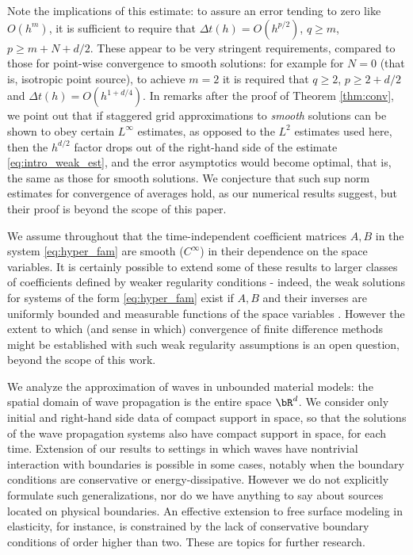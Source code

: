 Note the implications of this estimate: to assure an error tending to
zero like $O(h^m)$, it is sufficient to require that $\Delta t(h) = O(h^{p/2})$, $q
\ge m$, $p \ge m +N+d/2$. These appear to be very stringent
requirements, compared to those for point-wise convergence to smooth solutions: for example for $N=0$ (that is, isotropic point source),
to achieve $m=2$ it is required that $q \ge 2$, $p \ge 2+d/2$ and $\Delta t(h) =
O(h^{1+d/4})$. In remarks after the proof of Theorem \ref{thm:conv},
we point out that if staggered grid approximations to {\em smooth} solutions can be shown to obey certain
$L^{\infty}$ estimates, as opposed to the $L^2$ estimates used here,
then the $h^{d/2}$ factor drops out of the right-hand side of the
estimate \ref{eq:intro_weak_est}, and the error asymptotics would
become optimal, that is, the same as those for smooth solutions. We
conjecture that such sup norm estimates for convergence of averages
hold, as our numerical results suggest, but their proof is beyond the
scope of this paper.

We assume throughout that the time-independent
coefficient matrices $A,B$ in the system \ref{eq:hyper_fam} are
smooth ($C^{\infty}$) in their dependence on the space variables. It
is certainly possible to extend some of these results to larger
classes of coefficients defined by weaker regularity
conditions - indeed, the weak solutions for systems of
the form \ref{eq:hyper_fam} exist if $A, B$ and their inverses are
uniformly bounded and measurable functions of the space variables
\cite[]{BlazekStolkSymes:13}. However the extent to which (and sense
in which) convergence
of finite difference methods might be established with such weak
regularity assumptions is an open question, beyond the scope of this work.

We analyze the approximation of waves in unbounded material models:
the spatial domain of wave propagation is the entire space $\bR^d$. We
consider only initial and right-hand side data of compact support in
space, so that the solutions of the wave propagation systems also have
compact support in space, for each time. Extension of our results to
settings in which waves have nontrivial interaction with boundaries is
possible in some cases, notably when the boundary conditions are
conservative or energy-dissipative. However we do not explicitly
formulate such generalizations, nor do we have anything to say about
sources located on physical boundaries. An effective extension to free
surface modeling in elasticity, for instance, is constrained by the
lack of conservative boundary conditions of order higher than
two. These are topics for further research.

